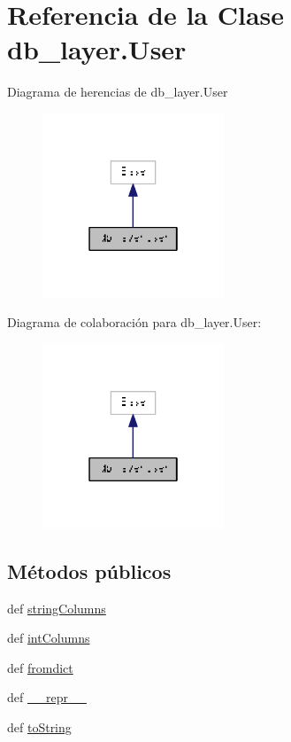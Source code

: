 \hypertarget{classdb__layer_1_1_user}{\section{Referencia de la Clase db\-\_\-layer.\-User}
\label{classdb__layer_1_1_user}
}


Diagrama de herencias de db\-\_\-layer.\-User\nopagebreak
\begin{figure}[H]
\begin{center}
\leavevmode
\includegraphics[width=154pt]{classdb__layer_1_1_user__inherit__graph}
\end{center}
\end{figure}


Diagrama de colaboración para db\-\_\-layer.\-User\-:\nopagebreak
\begin{figure}[H]
\begin{center}
\leavevmode
\includegraphics[width=154pt]{classdb__layer_1_1_user__coll__graph}
\end{center}
\end{figure}
\subsection*{Métodos públicos}
\begin{DoxyCompactItemize}
\item 
def \hyperlink{classdb__layer_1_1_user_a2d9e52ef307d7bba356ba9b1e65d6724}{string\-Columns}
\item 
def \hyperlink{classdb__layer_1_1_user_a7ab0409760a114e0901b490be218e3c6}{int\-Columns}
\item 
def \hyperlink{classdb__layer_1_1_user_a153f46dc9869527dcae554fea786d52f}{fromdict}
\item 
def \hyperlink{classdb__layer_1_1_user_a08d47a952fa6c5e35a53186babee6781}{\-\_\-\-\_\-repr\-\_\-\-\_\-}
\item 
def \hyperlink{classdb__layer_1_1_user_a6eb84d2363fb99e85e098f9ebd10cd19}{to\-String}
\end{DoxyCompactItemize}

